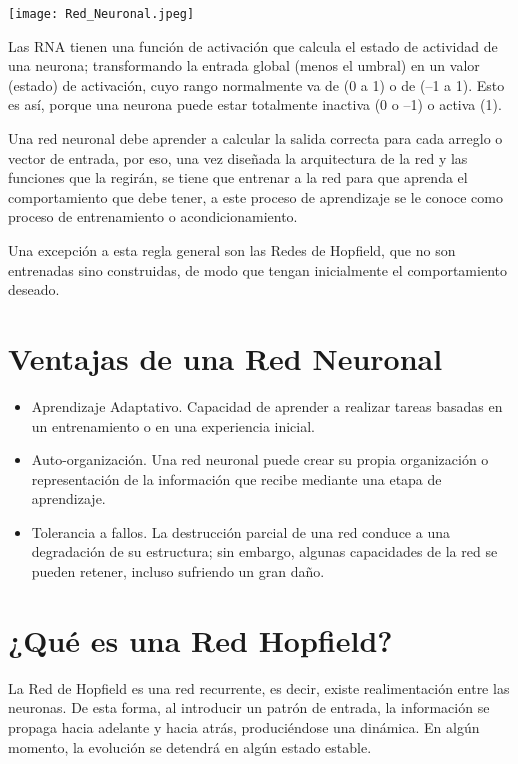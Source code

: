 \documentclass[12pt]{article}
\begin{document}
\begin{center}
    \texttt{[image: Red\_Neuronal.jpeg]}
\end{center}

Las RNA tienen una función de activación que calcula el estado de actividad de una neurona; transformando la entrada global (menos el umbral) en un valor (estado) de activación, cuyo rango normalmente va de (0 a 1) o de (–1 a 1). Esto es así, porque una neurona puede estar totalmente inactiva (0 o –1) o activa (1).

Una red neuronal debe aprender a calcular la salida correcta para cada arreglo o vector de entrada, por eso, una vez diseñada la arquitectura de la red y las funciones que la regirán, se tiene que entrenar a la red para que aprenda el comportamiento que debe tener, a este proceso de aprendizaje se le conoce como proceso de entrenamiento o acondicionamiento. 

Una excepción a esta regla general son las Redes de Hopfield, que no son entrenadas sino construidas, de modo que tengan inicialmente el comportamiento deseado. 

\section*{Ventajas de una Red Neuronal}

\begin{itemize}
    \item Aprendizaje Adaptativo. Capacidad de aprender a realizar tareas basadas en un entrenamiento o en una experiencia inicial.
    \item Auto-organización. Una red neuronal puede crear su propia organización o representación de la información que recibe mediante una etapa de aprendizaje. 
    \item Tolerancia a fallos. La destrucción parcial de una red conduce a una degradación de su estructura; sin embargo, algunas capacidades de la red se pueden retener, incluso sufriendo un gran daño.
\end{itemize} 

\section*{¿Qué es una Red Hopfield?}

La Red de Hopfield es una red recurrente, es decir, existe realimentación entre las neuronas. De esta forma, al introducir un patrón de entrada, la información se propaga hacia adelante y hacia atrás, produciéndose una dinámica. En algún momento, la evolución se detendrá en algún estado estable. 
\end{document}
